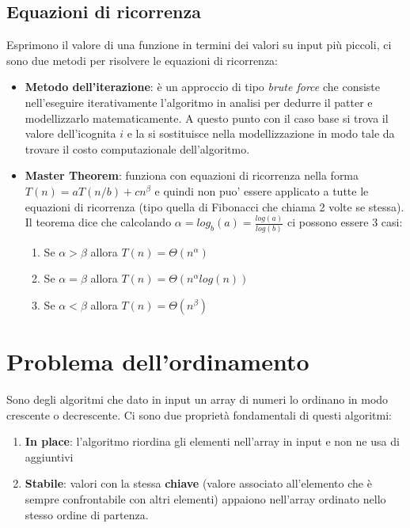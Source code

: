 \documentclass{article}
\begin{document}
\subsection{Equazioni di ricorrenza}
Esprimono il valore di una funzione in termini dei valori su input più piccoli, ci sono due metodi per risolvere le equazioni di ricorrenza:
\begin{itemize}
    \item \textbf{Metodo dell'iterazione}: è un approccio di tipo \textit{brute force} che consiste nell'eseguire iterativamente l'algoritmo in analisi per dedurre il patter e modellizzarlo matematicamente. 
    A questo punto con il caso base si trova il valore dell'icognita $i$ e la si sostituisce nella modellizzazione in modo tale da trovare il costo computazionale dell'algoritmo.
    \item \textbf{Master Theorem}: funziona con equazioni di ricorrenza nella forma $T(n) = aT(n/b) +cn^\beta$ e quindi non puo' essere applicato a tutte le equazioni di ricorrenza (tipo quella di Fibonacci che chiama 2 volte se stessa). Il teorema dice che calcolando $\alpha = log_b(a) = \frac{log(a)}{log(b)}$ ci possono essere 3 casi:
    \begin{enumerate}
        \item Se $\alpha > \beta$ allora $T(n) = \Theta(n^\alpha)$
        \item Se $\alpha = \beta$ allora $T(n) = \Theta(n^\alpha log(n))$
        \item Se $\alpha < \beta$ allora $T(n) = \Theta(n^\beta)$
    \end{enumerate}
    
\end{itemize}

\section{Problema dell'ordinamento}
Sono degli algoritmi che dato in input un array di numeri lo ordinano in modo crescente o decrescente.
Ci sono due proprietà fondamentali di questi algoritmi: \begin{enumerate}
    \item \textbf{In place}: l'algoritmo riordina gli elementi nell'array in input e non ne usa di aggiuntivi
    \item \textbf{Stabile}: valori con la stessa \textbf{chiave} (valore associato all'elemento che è sempre confrontabile con altri elementi) appaiono nell'array ordinato nello stesso ordine di partenza.

\end{enumerate}
\end{document}
